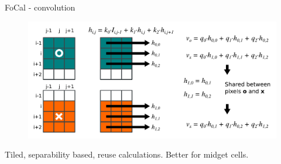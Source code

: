 \documentclass[17pt,mathserif]{beamer}
\begin{document}
    \begin{frame}{FoCal - convolution}
      \vspace*{-5em}
      \centering
      \begin{figure}
        \includegraphics[width=\textwidth]{./tiled-conv}
      \end{figure}
      \vspace*{-1em}
        Tiled, separability based, reuse calculations. Better for midget cells.
      
    \end{frame}
%    
\end{document}
